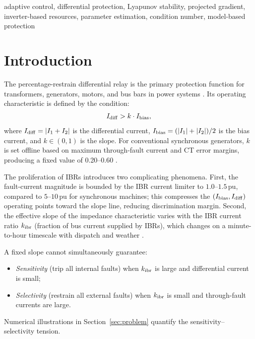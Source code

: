 \documentclass[journal]{IEEEtran}
\newcommand{\kibr}{k_{\rm ibr}}
\newcommand{\Idiff}{I_{\rm diff}}
\newcommand{\Ibias}{I_{\rm bias}}
\begin{document}
\begin{IEEEkeywords}
adaptive control, differential protection, Lyapunov stability,
projected gradient, inverter-based resources, parameter estimation,
condition number, model-based protection
\end{IEEEkeywords}

\section{Introduction}
\label{sec:intro}

The percentage-restrain differential relay is the primary protection
function for transformers, generators, motors, and bus bars in power
systems \cite{Anderson1999,Blackburn2006}.  Its operating characteristic
is defined by the condition:
\begin{equation}
  \Idiff > k \cdot \Ibias,
  \label{eq:trip_cond}
\end{equation}
where $\Idiff = |I_1 + I_2|$ is the differential current,
$\Ibias = (|I_1| + |I_2|)/2$ is the bias current, and
$k \in (0,1)$ is the slope.  For conventional synchronous generators,
$k$ is set offline based on maximum through-fault current and CT error
margins, producing a fixed value of 0.20--0.60 \cite{IEEE87}.

The proliferation of IBRs introduces two complicating phenomena.
First, the fault-current magnitude is bounded by the IBR current
limiter to $1.0$--$1.5$\,pu, compared to $5$--$10$\,pu for
synchronous machines; this compresses the $(\Ibias, \Idiff)$
operating points toward the slope line, reducing discrimination margin.
Second, the effective slope of the impedance characteristic varies with
the IBR current ratio $\kibr$ (fraction of bus current supplied by
IBRs), which changes on a minute-to-hour timescale with dispatch and
weather \cite{Telukunta2017,Hooshyar2019}.

A fixed slope cannot simultaneously guarantee:
\begin{itemize}
  \item \emph{Sensitivity} (trip all internal faults) when
        $\kibr$ is large and differential current is small;
  \item \emph{Selectivity} (restrain all external faults) when
        $\kibr$ is small and through-fault currents are large.
\end{itemize}
Numerical illustrations in Section~\ref{sec:problem} quantify the
sensitivity--selectivity tension.
\end{document}
